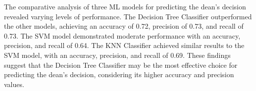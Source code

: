 The comparative analysis of three ML models for predicting the dean's decision revealed varying levels of performance. The Decision Tree Classifier outperformed the other models, achieving an accuracy of 0.72, precision of 0.73, and recall of 0.73. The SVM model demonstrated moderate performance with an accuracy, precision, and recall of 0.64. The KNN Classifier achieved similar results to the SVM model, with an accuracy, precision, and recall of 0.69. These findings suggest that the Decision Tree Classifier may be the most effective choice for predicting the dean's decision, considering its higher accuracy and precision values.
